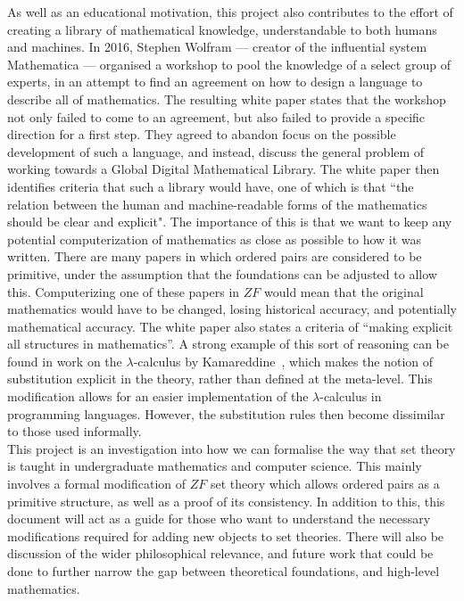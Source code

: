 \documentclass[11pt]{report}
\theoremstyle{definition}
\theoremstyle{theorem}
\theoremstyle{lemma}
\begin{document}
As well as an educational motivation, this project also contributes to the effort of creating a library of mathematical knowledge, understandable to both humans and machines.
In 2016, Stephen Wolfram --- creator of the influential system Mathematica --- organised a workshop to pool the knowledge of a select group of experts, in an attempt to find an agreement on how to design a language to describe all of mathematics. 
The resulting white paper states that the workshop not only failed to come to an agreement, but also failed to provide a specific direction for a first step. 
They agreed to abandon focus on the possible development of such a language, and instead, discuss the general problem of working towards a Global Digital Mathematical Library. 
The white paper then identifies criteria that such a library would have, one of which is that ``the relation between the human and machine-readable forms of the mathematics should be clear and explicit".
The importance of this is that we want to keep any potential computerization of mathematics as close as possible to how it was written. 
There are many papers in which ordered pairs are considered to be primitive, under the assumption that the foundations can be adjusted to allow this. 
Computerizing one of these papers in $\mathit{ZF}$ would mean that the original mathematics would have to be changed, losing historical accuracy, and potentially mathematical accuracy. 
The white paper also states a criteria of ``making explicit all structures in mathematics''. 
A strong example of this sort of reasoning can be found in work on the $\lambda$-calculus by Kamareddine~\cite{fairouz}, which makes the notion of substitution explicit in the theory, rather than defined at the meta-level.
This modification allows for an easier implementation of the $\lambda$-calculus in programming languages.
However, the substitution rules then become dissimilar to those used informally.\\

This project is an investigation into how we can formalise the way that set theory is taught in undergraduate mathematics and computer science.
This mainly involves a formal modification of $\mathit{ZF}$ set theory which allows ordered pairs as a primitive structure, as well as a proof of its consistency.
In addition to this, this document will act as a guide for those who want to understand the necessary modifications required for adding new objects to set theories. 
There will also be discussion of the wider philosophical relevance, and future work that could be done to further narrow the gap between theoretical foundations, and high-level mathematics. 
\end{document}
